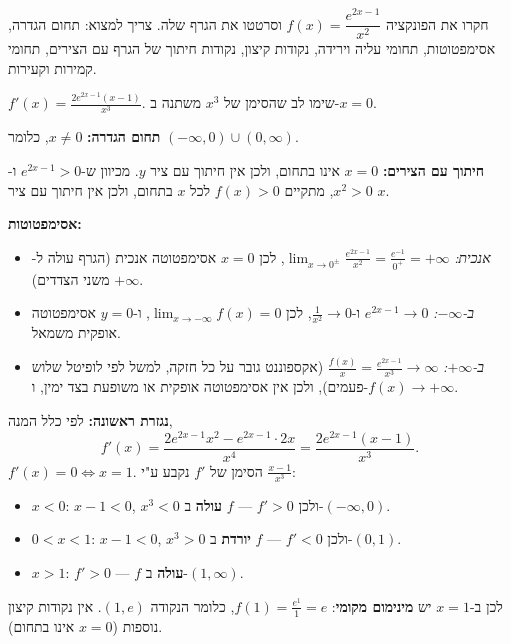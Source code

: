 
\begin{question}
חקרו את הפונקציה $f(x)=\dfrac{e^{2x-1}}{x^2}$ וסרטטו את הגרף שלה.
צריך למצוא: תחום הגדרה, אסימפטוטות, תחומי עליה וירידה, נקודות קיצון, נקודות חיתוך של הגרף עם הצירים, תחומי קמירות וקעירות.
\end{question}

\begin{hint}
$f'(x)=\frac{2e^{2x-1}(x-1)}{x^3}$. שימו לב שהסימן של $x^3$ משתנה ב-$x=0$.
\end{hint}

\begin{solution}
\textbf{תחום הגדרה:} $x\neq 0$, כלומר $(-\infty,0)\cup(0,\infty)$.

\textbf{חיתוך עם הצירים:} $x=0$ אינו בתחום, ולכן אין חיתוך עם ציר $y$. מכיוון ש-$e^{2x-1}>0$ ו-$x^2>0$, מתקיים $f(x)>0$ לכל $x$ בתחום, ולכן אין חיתוך עם ציר $x$.

\textbf{אסימפטוטות:}
\begin{itemize}
  \item \emph{אנכית:} $\lim_{x\to0^\pm}\frac{e^{2x-1}}{x^2} = \frac{e^{-1}}{0^+} = +\infty$, לכן $x=0$ אסימפטוטה אנכית (הגרף עולה ל-$+\infty$ משני הצדדים).
  \item \emph{ב-$-\infty$:} $e^{2x-1}\to0$ ו-$\frac1{x^2}\to0$, לכן $\lim_{x\to-\infty}f(x)=0$, ו-$y=0$ אסימפטוטה אופקית משמאל.
  \item \emph{ב-$+\infty$:} $\frac{f(x)}{x}=\frac{e^{2x-1}}{x^3}\to\infty$ (אקספוננט גובר על כל חזקה, למשל לפי לופיטל שלוש פעמים), ולכן אין אסימפטוטה אופקית או משופעת בצד ימין, ו-$f(x)\to+\infty$.
\end{itemize}

\textbf{נגזרת ראשונה:} לפי כלל המנה,
\[ f'(x) = \frac{2e^{2x-1}x^2 - e^{2x-1}\cdot 2x}{x^4} = \frac{2e^{2x-1}(x-1)}{x^3}. \]
$f'(x)=0 \iff x=1$. הסימן של $f'$ נקבע ע"י $\frac{x-1}{x^3}$:
\begin{itemize}
  \item $x<0$: $x-1<0$, $x^3<0$ ולכן $f'>0$ — $f$ \textbf{עולה} ב-$(-\infty,0)$.
  \item $0<x<1$: $x-1<0$, $x^3>0$ ולכן $f'<0$ — $f$ \textbf{יורדת} ב-$(0,1)$.
  \item $x>1$: $f'>0$ — $f$ \textbf{עולה} ב-$(1,\infty)$.
\end{itemize}
לכן ב-$x=1$ יש \textbf{מינימום מקומי}: $f(1)=\frac{e^{1}}{1}=e$, כלומר הנקודה $(1,e)$. אין נקודות קיצון נוספות ($x=0$ אינו בתחום).


\end{solution}

